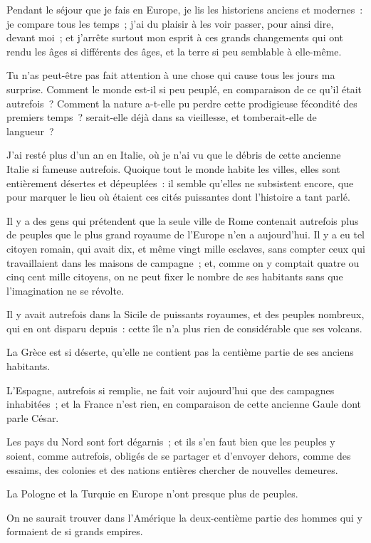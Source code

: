 \documentclass[french,twoside]{book} %
\begin{document}
\noindent Pendant le séjour que je fais en Europe, je lis les historiens anciens et modernes : je compare tous les temps ; j’ai du plaisir à les voir passer, pour ainsi dire, devant moi ; et j’arrête surtout mon esprit à ces grands changements qui ont rendu les âges si différents des âges, et la terre si peu semblable à elle-même.\par
Tu n’as peut-être pas fait attention à une chose qui cause tous les jours ma surprise. Comment le monde est-il si peu peuplé, en comparaison de ce qu’il était autrefois ? Comment la nature a-t-elle pu perdre cette prodigieuse fécondité des premiers temps ? serait-elle déjà dans sa vieillesse, et tomberait-elle de langueur ?\par
J’ai resté plus d’un an en Italie, où je n’ai vu que le débris de cette ancienne Italie si fameuse autrefois. Quoique tout le monde habite les villes, elles sont entièrement désertes et dépeuplées : il semble qu’elles ne subsistent encore, que pour marquer le lieu où étaient ces cités puissantes dont l’histoire a tant parlé.\par
Il y a des gens qui prétendent que la seule ville de Rome contenait autrefois plus de peuples que le plus grand royaume de l’Europe n’en a aujourd’hui. Il y a eu tel citoyen romain, qui avait dix, et même vingt mille esclaves, sans compter ceux qui travaillaient dans les maisons de campagne ; et, comme on y comptait quatre ou cinq cent mille citoyens, on ne peut fixer le nombre de ses habitants sans que l’imagination ne se révolte.\par
Il y avait autrefois dans la Sicile de puissants royaumes, et des peuples nombreux, qui en ont disparu depuis : cette île n’a plus rien de considérable que ses volcans.\par
La Grèce est si déserte, qu’elle ne contient pas la centième partie de ses anciens habitants.\par
L’Espagne, autrefois si remplie, ne fait voir aujourd’hui que des campagnes inhabitées ; et la France n’est rien, en comparaison de cette ancienne Gaule dont parle César.\par
Les pays du Nord sont fort dégarnis ; et ils s’en faut bien que les peuples y soient, comme autrefois, obligés de se partager et d’envoyer dehors, comme des essaims, des colonies et des nations entières chercher de nouvelles demeures.\par
La Pologne et la Turquie en Europe n’ont presque plus de peuples.\par
On ne saurait trouver dans l’Amérique la deux-centième partie des hommes qui y formaient de si grands empires.\par
\end{document}
